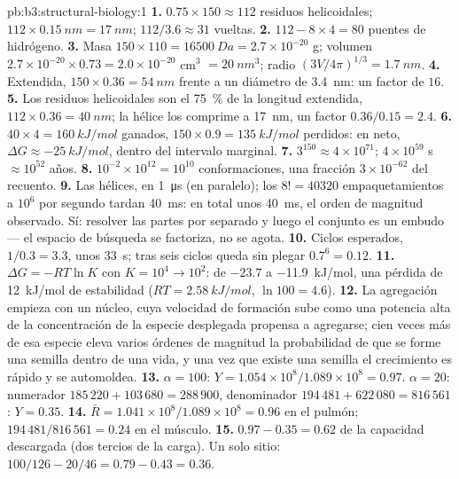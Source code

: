 \begin{solution}{pb:b3:structural-biology:1}
\textbf{1.} $0.75\times 150 \approx 112$ residuos helicoidales; $112\times
\qty{0.15}{nm} = \qty{17}{nm}$; $112/3.6 \approx 31$ vueltas.
\textbf{2.} $112 - 8\times 4 = 80$ puentes de hidrógeno.
\textbf{3.} Masa $150\times 110 = \qty{16500}{Da} = 2.7\times 10^{-20}$
g; volumen $2.7\times 10^{-20}\times 0.73 = 2.0\times 10^{-20}$ cm$^{3}$
$= \qty{20}{nm^3}$; radio $(3V/4\pi)^{1/3} = \qty{1.7}{nm}$.
\textbf{4.} Extendida, $150\times 0.36 = \qty{54}{nm}$ frente a un
diámetro de \qty{3.4}{nm}: un factor de $16$.
\textbf{5.} Los residuos helicoidales son el \qty{75}{\%} de la longitud
extendida, $112\times 0.36 = \qty{40}{nm}$; la hélice los comprime a
\qty{17}{nm}, un factor $0.36/0.15 = 2.4$.
\textbf{6.} $40\times 4 = \qty{160}{kJ/mol}$ ganados, $150\times 0.9 =
\qty{135}{kJ/mol}$ perdidos: en neto,
$\Delta G \approx \qty{-25}{kJ/mol}$, dentro del intervalo marginal.
\textbf{7.} $3^{150} \approx 4\times 10^{71}$; $4\times 10^{59}$ s
$\approx 10^{52}$ años.
\textbf{8.} $10^{-2}\times 10^{12} = 10^{10}$ conformaciones, una
fracción $3\times 10^{-62}$ del recuento.
\textbf{9.} Las hélices, en \qty{1}{\micro s} (en paralelo); los
$8! = \num{40320}$ empaquetamientos a $10^{6}$ por segundo tardan
\qty{40}{ms}: en total unos \qty{40}{ms}, el orden de magnitud
observado. Sí: resolver las partes por separado y luego el conjunto es un
embudo --- el espacio de búsqueda se factoriza, no se agota.
\textbf{10.} Ciclos esperados, $1/0.3 = 3.3$, unos \qty{33}{s}; tras seis
ciclos queda sin plegar $0.7^{6} = 0.12$.
\textbf{11.} $\Delta G = -RT\ln K$ con $K = 10^{4} \to 10^{2}$: de
$-23.7$ a \qty{-11.9}{kJ/mol}, una pérdida de \qty{12}{kJ/mol} de
estabilidad ($RT = \qty{2.58}{kJ/mol}$, $\ln 100 = 4.6$).
\textbf{12.} La agregación empieza con un núcleo, cuya velocidad de
formación sube como una potencia alta de la concentración de la especie
desplegada propensa a agregarse; cien veces más de esa especie eleva
varios órdenes de magnitud la probabilidad de que se forme una semilla
dentro de una vida, y una vez que existe una semilla el crecimiento es
rápido y se automoldea.
\textbf{13.} $\alpha = 100$: $Y = 1.054\times 10^{8}/1.089\times 10^{8} =
0.97$. $\alpha = 20$: numerador $185\,220 + 103\,680 = 288\,900$,
denominador $194\,481 + 622\,080 = 816\,561$: $Y = 0.35$.
\textbf{14.} $\bar R = 1.041\times 10^{8}/1.089\times 10^{8} = 0.96$ en
el pulmón; $194\,481/816\,561 = 0.24$ en el músculo.
\textbf{15.} $0.97 - 0.35 = 0.62$ de la capacidad descargada (dos tercios
de la carga). Un solo sitio: $100/126 - 20/46 = 0.79 - 0.43 = 0.36$.

\end{solution}
